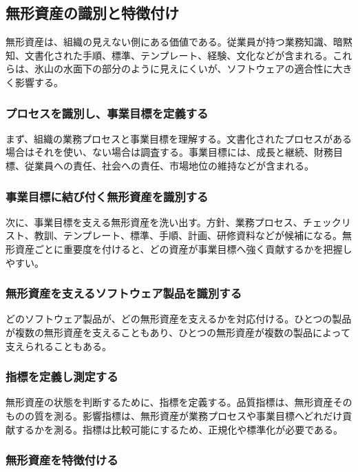 \subsection{無形資産の識別と特徴付け}

無形資産は、組織の見えない側にある価値である。従業員が持つ業務知識、暗黙知、文書化された手順、標準、テンプレート、経験、文化などが含まれる。これらは、氷山の水面下の部分のように見えにくいが、ソフトウェアの適合性に大きく影響する。

\subsubsection{プロセスを識別し、事業目標を定義する}

まず、組織の業務プロセスと事業目標を理解する。文書化されたプロセスがある場合はそれを使い、ない場合は調査する。事業目標には、成長と継続、財務目標、従業員への責任、社会への責任、市場地位の維持などが含まれる。

\subsubsection{事業目標に結び付く無形資産を識別する}

次に、事業目標を支える無形資産を洗い出す。方針、業務プロセス、チェックリスト、教訓、テンプレート、標準、手順、計画、研修資料などが候補になる。無形資産ごとに重要度を付けると、どの資産が事業目標へ強く貢献するかを把握しやすい。

\subsubsection{無形資産を支えるソフトウェア製品を識別する}

どのソフトウェア製品が、どの無形資産を支えるかを対応付ける。ひとつの製品が複数の無形資産を支えることもあり、ひとつの無形資産が複数の製品によって支えられることもある。

\subsubsection{指標を定義し測定する}

無形資産の状態を判断するために、指標を定義する。品質指標は、無形資産そのものの質を測る。影響指標は、無形資産が業務プロセスや事業目標へどれだけ貢献するかを測る。指標は比較可能にするため、正規化や標準化が必要である。

\subsubsection{無形資産を特徴付ける}

